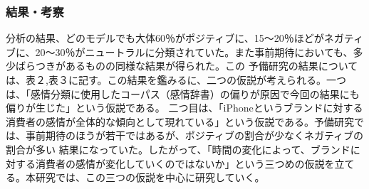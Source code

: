 \documentclass[uplatex,11pt]{jsarticle}
\begin{document}
\subsubsection{結果・考察}
分析の結果、どのモデルでも大体60％がポジティブに、15～20％ほどがネガティブに、20～30％がニュートラルに分類されていた。また事前期待においても、多少ばらつきがあるものの同様な結果が得られた。この
予備研究の結果については、表２,表３に記す。この結果を鑑みるに、二つの仮説が考えられる。一つは、「感情分類に使用したコーパス（感情辞書）の偏りが原因で今回の結果にも偏りが生じた」という仮説である。
二つ目は、「iPhoneというブランドに対する消費者の感情が全体的な傾向として現れている」という仮説である。予備研究では、事前期待のほうが若干ではあるが、ポジティブの割合が少なくネガティブの割合が多い
結果になっていた。したがって、「時間の変化によって、ブランドに対する消費者の感情が変化していくのではないか」という三つめの仮説を立てる。本研究では、この三つの仮説を中心に研究していく。
\end{document}
